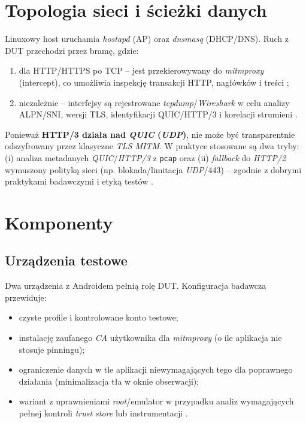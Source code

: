 \section{Topologia sieci i ścieżki danych}
Linuxowy host uruchamia \textit{hostapd} (AP) oraz \textit{dnsmasq} (DHCP/DNS). Ruch z DUT przechodzi przez bramę, gdzie:
\begin{enumerate}
  \item dla HTTP/HTTPS po TCP – jest przekierowywany do \textit{mitmproxy} (intercept), co umożliwia inspekcję transakcji HTTP, nagłówków i treści \cite{MitmproxyDocs,OWASPMASTGIntercept};
  \item niezależnie – interfejsy są rejestrowane \textit{tcpdump}/\textit{Wireshark} w celu analizy ALPN/SNI, wersji TLS, identyfikacji QUIC/HTTP/3 i korelacji strumieni \cite{WiresharkDocs,tcpdump,RFC9114,RFC9000}.
\end{enumerate}
Ponieważ \textbf{HTTP/3 działa nad \emph{QUIC} (\emph{UDP})}, nie może być transparentnie odszyfrowany przez klasyczne \emph{TLS MITM}. W praktyce stosowane są dwa tryby: (i) analiza metadanych \emph{QUIC}/\emph{HTTP/3} z \texttt{pcap} oraz (ii) \emph{fallback} do \emph{HTTP/2} wymuszony polityką sieci (np. blokada/limitacja \emph{UDP}/443) – zgodnie z dobrymi praktykami badawczymi i etyką testów \cite{RFC9114,OWASPMASTGIntercept}.

\section{Komponenty}
\subsection{Urządzenia testowe}
Dwa urządzenia z Androidem pełnią rolę DUT. Konfiguracja badawcza przewiduje:
\begin{itemize}
  \item czyste profile i kontrolowane konto testowe;
  \item instalację zaufanego \emph{CA} użytkownika dla \textit{mitmproxy} (o ile aplikacja nie stosuje pinningu);
  \item ograniczenie danych w tle aplikacji niewymagających tego dla poprawnego działania (minimalizacja tła w oknie obserwacji);
  \item wariant z uprawnieniami \textit{root}/emulator w przypadku analiz wymagających pełnej kontroli \emph{trust store} lub instrumentacji \cite{OWASPMASTGPinning,OWASPMASTGIntercept}.
\end{itemize}

